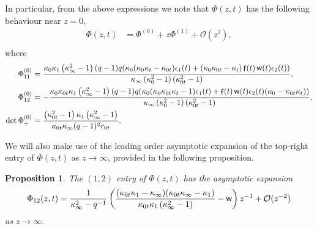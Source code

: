 \documentclass[a4paper,reqno,11pt]{amsart}
\numberwithin{equation}{section}
\numberwithin{figure}{section}
\theoremstyle{plain}
\newtheorem{proposition}[theorem]{Proposition}
\theoremstyle{remark}
\DeclareMathOperator{\sff}{{\sf f}}
\DeclareMathOperator{\sfw}{{\sf w}}
\numberwithin{rhp}{section}
\begin{document}
In particular, from the above expressions we note that $\Phi(z,t)$ has the following behaviour near $z=0$,
\begin{align}\label{asymp:Psiplus}
    \Phi(z,t)&=  \Phi^{(0)} + z \Phi^{(1)} + \mathcal{O}(z^2),  \\
\end{align}
where
\begin{equation}\label{asymp:Phiplus0}
\begin{split}
    \Phi^{(0)}_{11} &= \frac{\kappa_0\kappa_1\left(\kappa_{\infty}^2-1\right) (q-1) q (\kappa_0 (\kappa_0\kappa_{t}-\kappa_{0t})\epsilon_1(t)+ (\kappa_0\kappa_{0t}-\kappa_{t})\sff(t) \sfw(t) \epsilon_2(t))}{\kappa_{\infty}\left(\kappa_{0}^2-1\right) \left(\kappa_{0t}^2-1\right) },\\
    \Phi^{(0)}_{12} &= -\frac{\kappa_0\kappa_{0t}\kappa_1\left(\kappa_{\infty}^2-1\right) (q-1) q (\kappa_0 (\kappa_0\kappa_{0t}\kappa_{t}-1)\epsilon_1(t)+\sff(t) \sfw(t) \epsilon_2(t) (\kappa_{0}-\kappa_{0t}\kappa_{t}))}{\kappa_{\infty}\left(\kappa_{0}^2-1\right) \left(\kappa_{0t}^2-1\right) },\\
    \det \Phi_{+}^{(0)} &= \frac{\left(\kappa_{0t}^2-1\right) \kappa_{1} \left(\kappa_{\infty}^2-1\right)}{\kappa_{0t} \kappa_{\infty} (q-1)^2 r_{0t}}.
    \end{split}
\end{equation}



We will also make use of the leading order asymptotic expansion of the top-right entry of $\Phi(z,t)$ as $z\rightarrow \infty$, provided in the following proposition.
\begin{proposition}\label{Prop:asymp_Phi}
The $(1,2)$ entry of $\Phi(z,t)$ has the asymptotic expansion
\begin{equation}\label{elementPhi12}
    \Phi_{12}(z,t)=\frac{1}{\kappa_{\infty}^2-q^{-1}} \left(\frac{(\kappa_{0t} \kappa_{1}-\kappa_{\infty}) (\kappa_{0t} \kappa_{\infty}-\kappa_{1})}{\kappa_{0t} \kappa_{1} \left(\kappa_{\infty}^2-1\right)}-\sfw\right)z^{-1}+\mathcal{O}{(z^{-2})}
\end{equation}
as $z\rightarrow \infty$.
\end{proposition}
\end{document}
